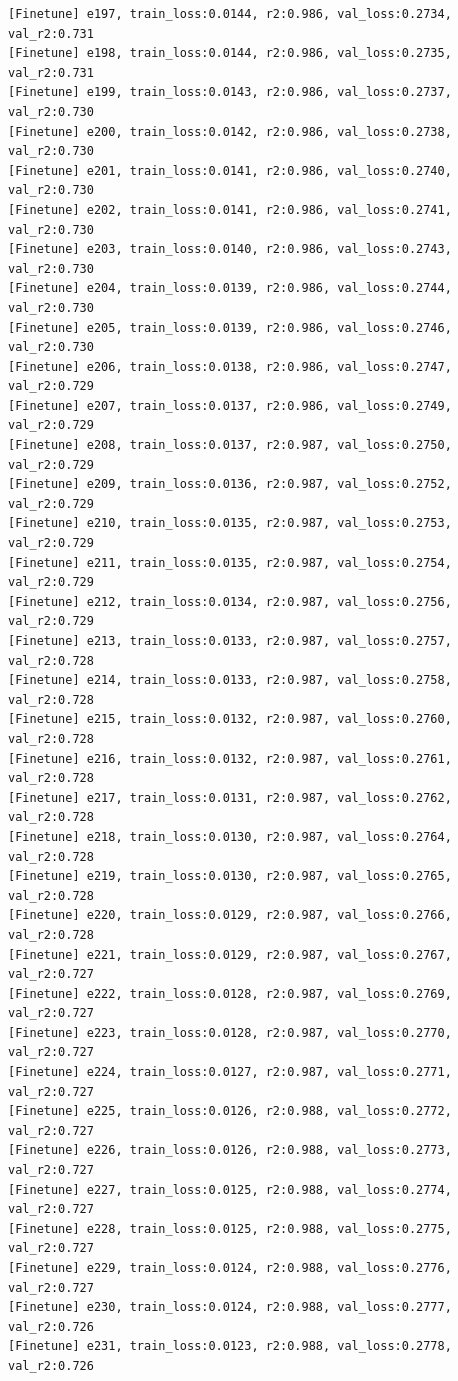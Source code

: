 \documentclass[a4paper, 12pt]{article}
\begin{document}
\begin{lstlisting}
[Finetune] e197, train_loss:0.0144, r2:0.986, val_loss:0.2734, val_r2:0.731
[Finetune] e198, train_loss:0.0144, r2:0.986, val_loss:0.2735, val_r2:0.731
[Finetune] e199, train_loss:0.0143, r2:0.986, val_loss:0.2737, val_r2:0.730
[Finetune] e200, train_loss:0.0142, r2:0.986, val_loss:0.2738, val_r2:0.730
[Finetune] e201, train_loss:0.0141, r2:0.986, val_loss:0.2740, val_r2:0.730
[Finetune] e202, train_loss:0.0141, r2:0.986, val_loss:0.2741, val_r2:0.730
[Finetune] e203, train_loss:0.0140, r2:0.986, val_loss:0.2743, val_r2:0.730
[Finetune] e204, train_loss:0.0139, r2:0.986, val_loss:0.2744, val_r2:0.730
[Finetune] e205, train_loss:0.0139, r2:0.986, val_loss:0.2746, val_r2:0.730
[Finetune] e206, train_loss:0.0138, r2:0.986, val_loss:0.2747, val_r2:0.729
[Finetune] e207, train_loss:0.0137, r2:0.986, val_loss:0.2749, val_r2:0.729
[Finetune] e208, train_loss:0.0137, r2:0.987, val_loss:0.2750, val_r2:0.729
[Finetune] e209, train_loss:0.0136, r2:0.987, val_loss:0.2752, val_r2:0.729
[Finetune] e210, train_loss:0.0135, r2:0.987, val_loss:0.2753, val_r2:0.729
[Finetune] e211, train_loss:0.0135, r2:0.987, val_loss:0.2754, val_r2:0.729
[Finetune] e212, train_loss:0.0134, r2:0.987, val_loss:0.2756, val_r2:0.729
[Finetune] e213, train_loss:0.0133, r2:0.987, val_loss:0.2757, val_r2:0.728
[Finetune] e214, train_loss:0.0133, r2:0.987, val_loss:0.2758, val_r2:0.728
[Finetune] e215, train_loss:0.0132, r2:0.987, val_loss:0.2760, val_r2:0.728
[Finetune] e216, train_loss:0.0132, r2:0.987, val_loss:0.2761, val_r2:0.728
[Finetune] e217, train_loss:0.0131, r2:0.987, val_loss:0.2762, val_r2:0.728
[Finetune] e218, train_loss:0.0130, r2:0.987, val_loss:0.2764, val_r2:0.728
[Finetune] e219, train_loss:0.0130, r2:0.987, val_loss:0.2765, val_r2:0.728
[Finetune] e220, train_loss:0.0129, r2:0.987, val_loss:0.2766, val_r2:0.728
[Finetune] e221, train_loss:0.0129, r2:0.987, val_loss:0.2767, val_r2:0.727
[Finetune] e222, train_loss:0.0128, r2:0.987, val_loss:0.2769, val_r2:0.727
[Finetune] e223, train_loss:0.0128, r2:0.987, val_loss:0.2770, val_r2:0.727
[Finetune] e224, train_loss:0.0127, r2:0.987, val_loss:0.2771, val_r2:0.727
[Finetune] e225, train_loss:0.0126, r2:0.988, val_loss:0.2772, val_r2:0.727
[Finetune] e226, train_loss:0.0126, r2:0.988, val_loss:0.2773, val_r2:0.727
[Finetune] e227, train_loss:0.0125, r2:0.988, val_loss:0.2774, val_r2:0.727
[Finetune] e228, train_loss:0.0125, r2:0.988, val_loss:0.2775, val_r2:0.727
[Finetune] e229, train_loss:0.0124, r2:0.988, val_loss:0.2776, val_r2:0.727
[Finetune] e230, train_loss:0.0124, r2:0.988, val_loss:0.2777, val_r2:0.726
[Finetune] e231, train_loss:0.0123, r2:0.988, val_loss:0.2778, val_r2:0.726

\end{lstlisting}
\end{document}
